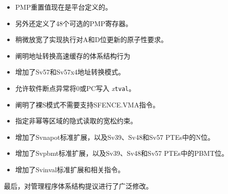 \begin{itemize}
\item PMP重置值现在是平台定义的。
\item 另外还定义了48个可选的PMP寄存器。
\item 稍微放宽了实现执行对A和D位更新的原子性要求。
\item 阐明地址转换高速缓存的体系结构行为
\item 增加了Sv57和Sv57x4地址转换模式。
\item 允许软件断点异常将0或PC写入 {\em x}\/{\tt tval}。
\item 阐明了裸S模式不需要支持SFENCE.VMA指令。
\item 指定非幂等区域的隐式读取的宽松约束。
\item 增加了Svnapot标准扩展，以及Sv39、Sv48和Sv57 PTEs中的N位。
\item 增加了Svpbmt标准扩展，以及Sv39、Sv48和Sv57 PTEs中的PBMT位。
\item 增加了Svinval标准扩展和相关指令。
\end{itemize}

最后，对管理程序体系结构提议进行了广泛修改。

\newpage

